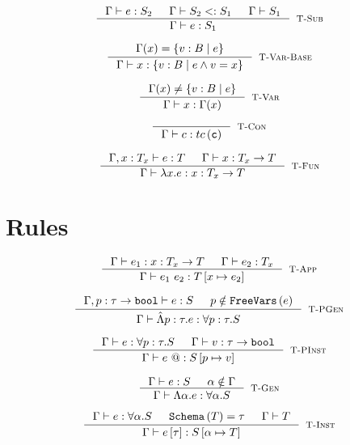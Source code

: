 \hfill{}

$$
\inference{
	\hastype{\Gamma}{e}{S_2} && \isSub{\Gamma}{S_2}{S_1}
	&& \isWellFormed{\Gamma}{S_1}
}{
	\hastype{\Gamma}{e}{S_1}
}[\tsub]
$$

$$
\inference{
	\Gamma(x) = \tref{B}{e}
}{
	\hastype{\Gamma}{x}{\tref{B}{e \land \vref = x}}
}[\rulename{T-Var-Base}]
$$

$$
\inference{
	\Gamma(x) \neq \tref{B}{e}
}{
	\hastype{\Gamma}{x}{\Gamma(x)}
}[\rulename{T-Var}]
$$

$$
\inference{
}{
	\hastype{\Gamma}{c}{\tc{c}}
}[\tconst]
$$

$$
\inference{
	\hastype{\Gamma, x : \mlTy{T_x}}{e}{\mlTy{T}} 
	&& \isWellFormed{\Gamma}{\tfun{x}{\mlTy{T_x}}{\mlTy{T}}}
}{
	\hastype{\Gamma}{\efun{x}{e}}{\tfun{x}{\mlTy{T_x}}{\mlTy{T}}}
}[\rulename{T-Fun}]
$$

\section*{Rules}
$$\label{tapp}
\inference{
	\hastype{\Gamma}{e_1}{\tfun{x}{T_x}{T}} && 
	\hastype{\Gamma}{e_2}{T_x}
}{
	\hastype{\Gamma}{\eapp{e_1}{e_2}}{T\sub{x}{e_2}}
}[\tapp]
$$

$$
\inference{
	\hastype{\Gamma, p:\tau \rightarrow \tbbool}{e}{S} &&
	p \notin \fv{e}
}{
	\hastype{\Gamma}{\epabs{p}{\tau}{e}}{\tpabs{p}{\tau}{S}}
}[\tpgen]
$$

$$
\inference{
	\hastype{\Gamma}{e}{\tpabs{p}{\tau}{S}} && 
	\hastype{\Gamma}{v}{\tau \rightarrow \tbbool} 
}{
	\hastype{\Gamma}{\epapp{e}}{S\sub{p}{v}}
}[\tpinst]
$$

$$
\inference{
	\hastype{\Gamma}{e}{S} && 
	\alpha \notin \Gamma
}{
	\hastype{\Gamma}{\etabs{\alpha}{e}}{\ttabs{\alpha}{S}}
}[\tgen]
$$

$$
\inference{
	\hastype{\Gamma}{e}{\ttabs{\alpha}{S}} && 
	\sch{\mlTy{T}} = \tau && \isWellFormed{\Gamma}{\mlTy{T}}
}{
	\hastype{\Gamma}{\etapp{e}{\tau}}{S\sub{\alpha}{\mlTy{T}}}
}[\tinst]
$$




